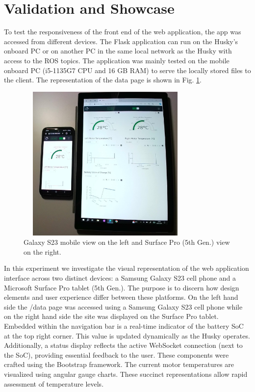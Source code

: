 \documentclass[conference]{IEEEtran}
\begin{document}
\section{Validation and Showcase}\label{VS}
To test the responsiveness of the front end of the web application, the app was accessed from different devices. The Flask application can run on the Husky's onboard PC or on another PC in the same local network as the Husky with access to the ROS topics. The application was mainly tested on the mobile onboard PC (i5-1135G7 CPU and 16 GB RAM) to serve the locally stored files to the client.
The representation of the data page is shown in Fig. \ref{fig:galaxysurface}. 
\begin{figure}[htbp]
    \centerline{\includegraphics[width=8.8cm, height=7.75cm]{Pictures/galaxysurfacecut.png}}
    \caption{Galaxy S23 mobile view on the left and Surface Pro (5th Gen.) view on the right.}
    \label{fig:galaxysurface}
\end{figure}
In this experiment we investigate the visual representation of the web application interface across two distinct devices: a Samsung Galaxy S23 cell phone and a Microsoft Surface Pro tablet (5th Gen.). The purpose is to discern how design elements and user experience differ between these platforms.
On the left hand side the /data page was accessed using a Samsung Galaxy S23 cell phone while on the right hand side the site was displayed on the Surface Pro tablet.
Embedded within the navigation bar is a real-time indicator of the battery SoC at the top right corner. This value is updated dynamically as the Husky operates.
Additionally, a status display reflects the active WebSocket connection (next to the SoC), providing essential feedback to the user.
These components were crafted using the Bootstrap framework. The current motor temperatures are visualized using angular gauge charts. These succinct representations allow rapid assessment of temperature levels.
\end{document}
